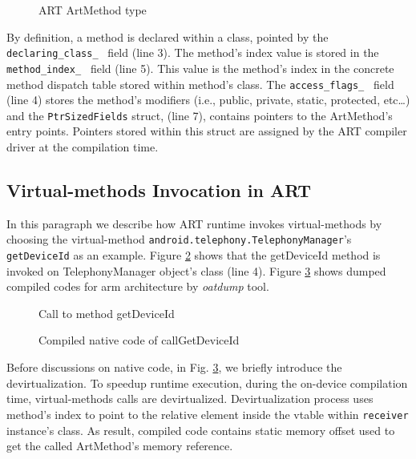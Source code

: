 \begin{figure}[h!]

\caption{ART ArtMethod type}
\label{art:artmethod}
\end{figure}

By definition, a method is declared within a class, pointed by the {\tt declaring\_class\_ } field (line 3). The method's index value is stored in the {\tt method\_index\_ } field (line 5). This value is the method's index in the concrete method dispatch table stored within method's class. The {\tt access\_flags\_ } field (line 4) stores the method's modifiers (i.e., public, private, static, protected, etc\ldots) and the {\tt PtrSizedFields} struct, (line 7), contains pointers to the ArtMethod's entry points. Pointers stored within this struct are assigned by the ART compiler driver at the compilation time. 


\subsection{Virtual-methods Invocation in ART}
\label{subsub:artinvoke}
In this paragraph we describe how ART runtime invokes virtual-methods by choosing the virtual-method {\tt android.telephony.TelephonyManager}'s {\tt getDeviceId} as an example. Figure \ref{fig:es1} shows that the getDeviceId method is invoked on TelephonyManager object's class (line 4). Figure \ref{fig:oatdump} shows dumped compiled codes for arm architecture by \textit{oatdump} tool. 


\begin{figure}[H]

\caption{Call to method getDeviceId} 
\label{fig:es1}
\end{figure}

\begin{figure}[h!]

\caption{Compiled native code of callGetDeviceId}
\label{fig:oatdump}
\end{figure}


Before discussions on native code, in Fig. \ref{fig:oatdump}, we briefly introduce the devirtualization. To speedup runtime execution, during the on-device compilation time, virtual-methods calls are devirtualized. Devirtualization process uses method's index to point to the relative element inside the vtable within {\tt receiver} instance's class.  As result, compiled code contains static memory offset used to get the called ArtMethod's memory reference. 
 

